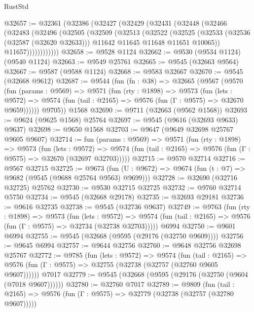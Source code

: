 \begin{lexlean}{RustStd}
\begin{coremodule}
@32657 := @32361
    (@32386
      (@32427
        (@32429
          (@32431
            (@32448
              (@32466
                (@32483
                  (@32496
                    (@32505
                      (@32509
                        (@32513
                          (@32522
                            (@32525
                              (@32533
                                (@32536 (@32587 (@32620 @32633)))
                                @11642
                                @11645
                                @11648
                                @11651
                                @10065))
                            @11657))))))))))))
@32658 := @9528 @1124
@32662 := @9530 (@9534 @1124) (@9540 @1124)
@32663 := @9549 @25761
@32665 := @9545 (@32663 @9564)
@32667 := @9587 (@9588 @1124)
@32668 := @9583 @32667
@32670 := @9545 (@32668 @9612)
@32687 := @9544
    (fun (fn : @38) =>
    @32665
      (@9567
        (@9570
          (fun (params : @9569) =>
          @9571
            (fun (rty : @1898) =>
            @9573
              (fun (lets : @9572) =>
              @9574 (fun (tail : @2165) => @9576 (fun (Γ : @9575) => @32670 @9659))))))
        @9705))
    @1568
@32690 := @9711 (@32663 (@9562 @1568))
@32693 := @9624 (@9625 @1568) @25764
@32697 := @9545 (@9616 (@32693 @9633) @9637)
@32698 := @9650 @1568
@32703 := @9647 (@9649 @32698 @25767 @9605 @9607)
@32714 := fun (params : @9569) =>
  @9571
    (fun (rty : @1898) =>
    @9573
      (fun (lets : @9572) =>
      @9574 (fun (tail : @2165) => @9576 (fun (Γ : @9575) => @32670 (@32697 @32703)))))
@32715 := @9570 @32714
@32716 := @9567 @32715
@32725 := @9673
    (fun (U : @9672) => @9674 (fun (t : @7) => @9682 (@9545 (@9688 @25764 @9563) @9699)))
@32728 := @32690 (@32716 @32725) @25762
@32730 := @9530 @32715 @32725
@32732 := @9760 @32714 @5750
@32734 := @9545 (@32668 @29178)
@32735 := @32693 @29181
@32736 := @9616 @32735
@32738 := @9545 (@32736 @9637)
@32749 := @9763
    (fun (rty : @1898) =>
    @9573
      (fun (lets : @9572) =>
      @9574 (fun (tail : @2165) => @9576 (fun (Γ : @9575) => @32734 (@32738 @32703)))))
    @6994
@32750 := @9601 @6994
@32755 := @9545 (@32668 (@9595 (@29176 (@32750 @9609))))
@32756 := @9645 @6994
@32757 := @9644 @32756
@32760 := @9648 @32756 @32698 @25767
@32772 := @9785
    (fun (lets : @9572) =>
    @9574
      (fun (tail : @2165) =>
      @9576 (fun (Γ : @9575) => @32755 (@32738 (@32757 (@32760 @9605 @9607))))))
    @7017
@32779 := @9545 (@32668 (@9595 (@29176 (@32750 (@9604 (@7018 @9607))))))
@32780 := @32760 @7017
@32789 := @9809
    (fun (tail : @2165) => @9576 (fun (Γ : @9575) => @32779 (@32738 (@32757 (@32780 @9607)))))

\end{coremodule}
\end{lexlean}
